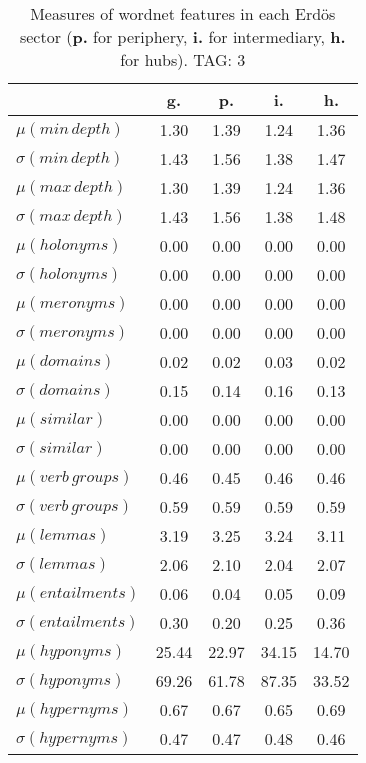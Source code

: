 \begin{table}[h!]
\begin{center}
\begin{tabular}{| l | c | c | c | c |}\hline
 & g. & p. & i. & h. \\\hline
$\mu(min\,depth)$ & 1.30  & 1.39  & 1.24  & 1.36 \\\hline
$\sigma(min\,depth)$ & 1.43  & 1.56  & 1.38  & 1.47 \\\hline
$\mu(max\,depth)$ & 1.30  & 1.39  & 1.24  & 1.36 \\\hline
$\sigma(max\,depth)$ & 1.43  & 1.56  & 1.38  & 1.48 \\\hline
$\mu(holonyms)$ & 0.00  & 0.00  & 0.00  & 0.00 \\\hline
$\sigma(holonyms)$ & 0.00  & 0.00  & 0.00  & 0.00 \\\hline
$\mu(meronyms)$ & 0.00  & 0.00  & 0.00  & 0.00 \\\hline
$\sigma(meronyms)$ & 0.00  & 0.00  & 0.00  & 0.00 \\\hline
$\mu(domains)$ & 0.02  & 0.02  & 0.03  & 0.02 \\\hline
$\sigma(domains)$ & 0.15  & 0.14  & 0.16  & 0.13 \\\hline
$\mu(similar)$ & 0.00  & 0.00  & 0.00  & 0.00 \\\hline
$\sigma(similar)$ & 0.00  & 0.00  & 0.00  & 0.00 \\\hline
$\mu(verb\,groups)$ & 0.46  & 0.45  & 0.46  & 0.46 \\\hline
$\sigma(verb\,groups)$ & 0.59  & 0.59  & 0.59  & 0.59 \\\hline
$\mu(lemmas)$ & 3.19  & 3.25  & 3.24  & 3.11 \\\hline
$\sigma(lemmas)$ & 2.06  & 2.10  & 2.04  & 2.07 \\\hline
$\mu(entailments)$ & 0.06  & 0.04  & 0.05  & 0.09 \\\hline
$\sigma(entailments)$ & 0.30  & 0.20  & 0.25  & 0.36 \\\hline
$\mu(hyponyms)$ & 25.44  & 22.97  & 34.15  & 14.70 \\\hline
$\sigma(hyponyms)$ & 69.26  & 61.78  & 87.35  & 33.52 \\\hline
$\mu(hypernyms)$ & 0.67  & 0.67  & 0.65  & 0.69 \\\hline
$\sigma(hypernyms)$ & 0.47  & 0.47  & 0.48  & 0.46 \\\hline
\end{tabular}
\caption{Measures of wordnet features in each Erd\"os sector ({{\bf p.}} for periphery, {{\bf i.}} for intermediary, {{\bf h.}} for hubs). TAG: 3}
\end{center}
\end{table}